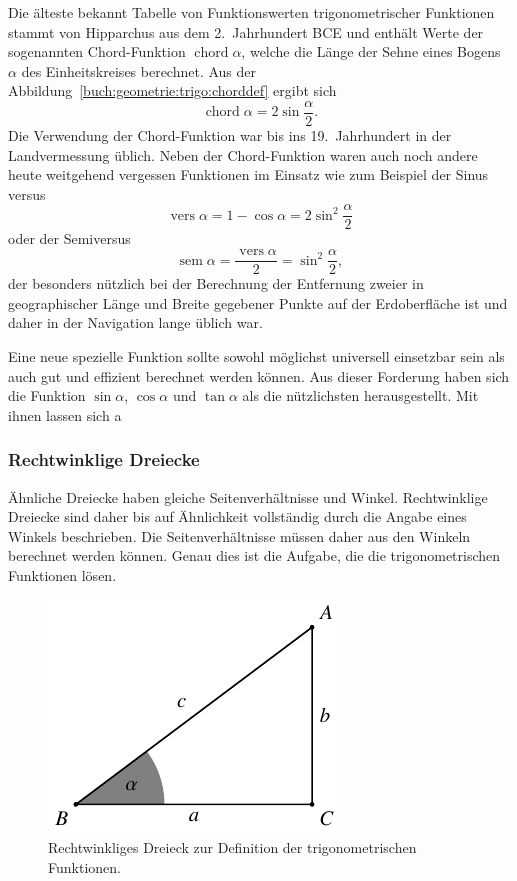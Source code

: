 Die älteste bekannt Tabelle von Funktionswerten trigonometrischer
Funktionen stammt von Hipparchus aus dem 2.~Jahrhundert BCE und
enthält Werte der sogenannten Chord-Funktion $\operatorname{chord}\alpha$,
welche die Länge der Sehne eines Bogens $\alpha$ des Einheitskreises
berechnet.
Aus der Abbildung~\ref{buch:geometrie:trigo:chorddef} ergibt sich
\[
\operatorname{chord}\alpha = 2\sin\frac{\alpha}2.
\]
Die Verwendung der Chord-Funktion war bis ins 19.~Jahrhundert in der
Landvermessung üblich.
Neben der Chord-Funktion waren auch noch andere heute weitgehend
vergessen Funktionen im Einsatz wie zum Beispiel der Sinus versus
\[
\operatorname{vers}\alpha=1-\cos\alpha
=
2\sin^2\frac{\alpha}2
\]
oder der Semiversus
\[
\operatorname{sem}\alpha
=
\frac{\operatorname{vers}\alpha}{2}
=
\sin^2\frac{\alpha}2,
\]
der besonders nützlich bei der Berechnung der Entfernung
zweier in geographischer Länge und Breite gegebener Punkte
auf der Erdoberfläche ist und daher in der Navigation lange
üblich war.

Eine neue spezielle Funktion sollte sowohl möglichst
universell einsetzbar sein als auch gut und effizient
berechnet werden können.
Aus dieser Forderung haben sich die Funktion $\sin\alpha$,
$\cos\alpha$ und $\tan\alpha$ als die nützlichsten herausgestellt.
Mit ihnen lassen sich a

%
%
\subsubsection{Rechtwinklige Dreiecke}
Ähnliche Dreiecke haben gleiche Seitenverhältnisse und Winkel.
Rechtwinklige Dreiecke sind daher bis auf Ähnlichkeit vollständig
durch die Angabe eines Winkels beschrieben.
Die Seitenverhältnisse müssen daher aus den Winkeln berechnet werden
können.
Genau dies ist die Aufgabe, die die trigonometrischen Funktionen lösen.

\begin{figure}
\centering
\includegraphics{chapters/030-geometrie/images/deftrig.pdf}
\caption{Rechtwinkliges Dreieck zur Definition der trigonometrischen
Funktionen.
\label{buch:geometrie:trigo:fig:definition}}
\end{figure}

